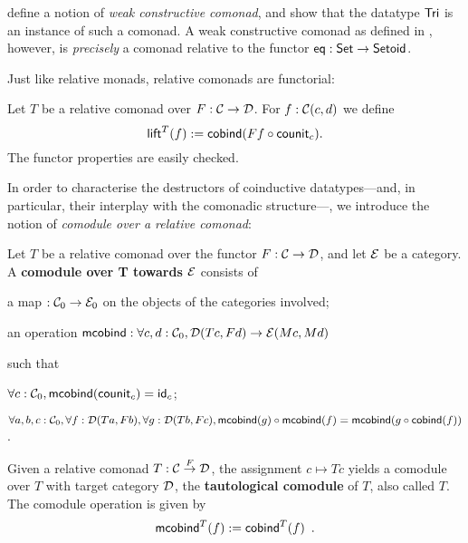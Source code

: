 \documentclass{amsart}
\newcommand{\fat}[1]{\textbf{#1}}
\begin{document}
\begin{example}
\noindent
\textcite{DBLP:conf/types/MatthesP11} define a notion of \emph{weak constructive comonad}, and show that the datatype $\Tri$
  is an instance of such a comonad. 
  A weak constructive comonad as defined in \parencite{DBLP:conf/types/MatthesP11}, however, is \emph{precisely}
  a comonad relative to the functor $\eq : \Set\to\Setoid$.
\end{example}


Just like relative monads, relative comonads are functorial:
\begin{definition}
 Let $T$ be a relative comonad over $F:\C\to\D$.
 For $f : \C(c,d)$ we define
  \[ \lift^T(f) := \cobind(\comp{\counit_c}{Ff}) .  \]
 The functor properties are easily checked.
\end{definition}


In order to characterise the destructors of coinductive datatypes---and, in particular, their interplay with the comonadic structure---, 
we introduce the notion of \emph{comodule
over a relative comonad}:

\begin{definition}\label{def:comodule}
 Let $T$ be a relative comonad over the functor $F:\C\to\D$, and let $\E$ be a category.
 A \fat{comodule over T towards $\E$} consists of
   \begin{packitem}
   \item a map $:\C_0 \to \E_0$ on the objects of the categories involved;
   \item an operation $\mcobind: \forall c,d:\C_0, \D(Tc,Fd) \to \E(Mc,Md)$
  \end{packitem}
  such that 
  \begin{packitem}
   \item $\forall c : \C_0, \mcobind(\counit_c) = \id_c$;
   \item $\forall a,b,c:\C_0, \forall f : \D(Ta,Fb),\forall g:\D(Tb,Fc), \\
        \comp{\mcobind(f)}{\mcobind(g)} = \mcobind(\comp{\cobind(f)}{g})$ .
  \end{packitem}

\end{definition}

\begin{example}\label{def:tautological_comodule}
  Given a relative comonad $T : \C\stackrel{F}{\to}\D$, the assignment $c \mapsto Tc$ yields a comodule over $T$ 
  with target category $\D$, the \textbf{tautological comodule} of $T$, also called $T$.
  The comodule operation is given by
    \[  \mcobind^T(f) := \cobind^T(f) \enspace . \]
\end{example}
\end{document}
